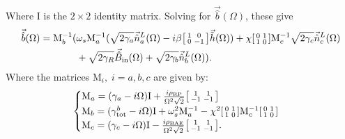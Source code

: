 Where $\mathrm{I}$ is the $2\times2$ identity matrix. Solving for $\vec{\hat{b}}(\Omega)$, these give
\begin{align}
\vec{\hat{b}}(\Omega)=\mathrm{M}_b^{-1}( &\omega_s\mathrm{M}_a^{-1}(\sqrt{2\gamma_a}\vec{\hat{n}}^L_a(\Omega)-i\beta\begin{bsmallmatrix}
1 & 0 \\ 
0 & -1
\end{bsmallmatrix}\vec{\tilde{h}}(\Omega)) + \chi\begin{bsmallmatrix}
0 & 1 \\ 
1 & 0
\end{bsmallmatrix}\mathrm{M}_c^{-1}\sqrt{2\gamma_c}\vec{\hat{n}}^L_c(\Omega)\\&+ \sqrt{2\gamma_R}\vec{\hat{B}}_\mathrm{in}(\Omega) + \sqrt{2\gamma_b}\vec{\hat{n}}^L_b(\Omega)).
\end{align}
Where the matrices $\mathrm{M}_i,\; i=a,b,c$ are given by:
\begin{equation}
\begin{cases}
\mathrm{M}_a = (\gamma_a-i\Omega)\mathrm{I}+\frac{i\rho_\mathrm{RP}}{\Omega^2 \sqrt{2}}\begin{bsmallmatrix}
1 & 1 \\ 
-1 & -1
\end{bsmallmatrix}\\
\mathrm{M}_b = (\gamma^b_\mathrm{tot}-i\Omega)\mathrm{I} + \omega_s^2 \mathrm{M}_a^{-1} - \chi^2\begin{bsmallmatrix}
0 & 1 \\ 
1 & 0
\end{bsmallmatrix} \mathrm{M}_c^{-1} \begin{bsmallmatrix}
0 & 1 \\ 
1 & 0
\end{bsmallmatrix}\\
\mathrm{M}_c = (\gamma_c-i\Omega)\mathrm{I}-\frac{i\rho_\mathrm{BAE}}{\Omega^2\sqrt{2}}\begin{bsmallmatrix}
1 & 1 \\ 
-1 & -1
\end{bsmallmatrix}.
\end{cases}
\end{equation}

